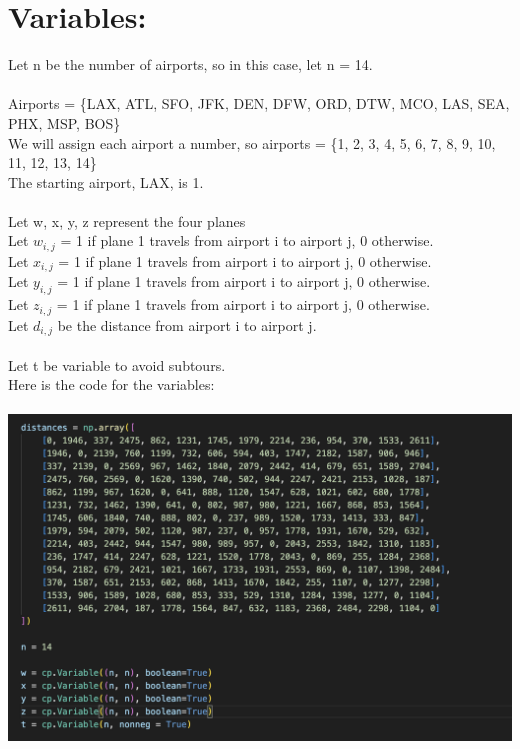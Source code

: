 \documentclass[12pt]{extarticle}
\begin{document}
\section*{\small Variables:}
Let n be the number of airports, so in this case, let n = 14. \\ \\
Airports = \{LAX, ATL, SFO, JFK, DEN, DFW, ORD, DTW, MCO, LAS, SEA, PHX, MSP, BOS\} \\
We will assign each airport a number, so airports = \{1, 2, 3, 4, 5, 6, 7, 8, 9, 10, 11, 12, 13, 14\} \\
The starting airport, LAX, is 1. \\ \\
Let w, x, y, z represent the four planes \\
Let $w_{i,j}$ = 1 if plane 1 travels from airport i to airport j, 0 otherwise. \\
Let $x_{i,j}$ = 1 if plane 1 travels from airport i to airport j, 0 otherwise. \\
Let $y_{i,j}$ = 1 if plane 1 travels from airport i to airport j, 0 otherwise. \\
Let $z_{i,j}$ = 1 if plane 1 travels from airport i to airport j, 0 otherwise. \\
Let $d_{i,j}$ be the distance from airport i to airport j. \\ \\
Let t be variable to avoid subtours. \\
Here is the code for the variables: \\ \\
\includegraphics{images/OptVars.png}
\end{document}
